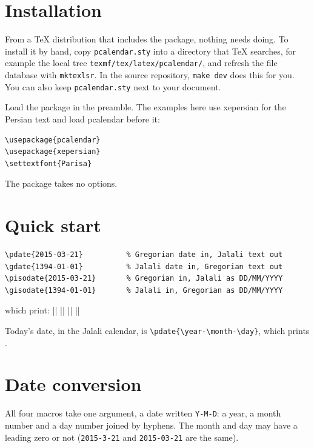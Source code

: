 \documentclass[11pt]{article}
\newcommand\iso[1]{\lr{#1}}            %
\newcommand\pkg[1]{\textsf{#1}}
\newcommand\cs[1]{\texttt{\textbackslash #1}}
\newcommand\gap{\par\smallskip}
\begin{document}
\section{Installation}\label{sec:installation2}

From a TeX distribution that includes the package, nothing needs doing. To install it by hand, copy
\texttt{pcalendar.sty} into a directory that TeX searches, for example the local tree
\texttt{texmf/tex/latex/pcalendar/}, and refresh the file database with \texttt{mktexlsr}. In the
source repository, \texttt{make dev} does this for you. You can also keep \texttt{pcalendar.sty}
next to your document.

Load the package in the preamble. The examples here use \pkg{xepersian} for the Persian text and load
\pkg{pcalendar} before it:
\begin{verbatim}
\usepackage{pcalendar}
\usepackage{xepersian}
\settextfont{Parisa}
\end{verbatim}
The package takes no options.

\section{Quick start}\label{sec:quick3}

\begin{verbatim}
\pdate{2015-03-21}          % Gregorian date in, Jalali text out
\gdate{1394-01-01}          % Jalali date in, Gregorian text out
\pisodate{2015-03-21}       % Gregorian in, Jalali as DD/MM/YYYY
\gisodate{1394-01-01}       % Jalali in, Gregorian as DD/MM/YYYY
\end{verbatim}
which print:
\ex||{}
\ex||{}
\ex||{\iso{\pisodate{2015-03-21}}}
\ex||{\iso{\gisodate{1394-01-01}}}
\gap
Today's date, in the Jalali calendar, is \cs{pdate}\texttt{\{\cs{year}-\cs{month}-\cs{day}\}}, which
prints \pdate{\year-\month-\day}.

\section{Date conversion}\label{sec:date4}

All four macros take one argument, a date written \texttt{Y-M-D}: a year, a month number and a day
number joined by hyphens. The month and day may have a leading zero or not
(\texttt{2015-3-21} and \texttt{2015-03-21} are the same).
\end{document}
